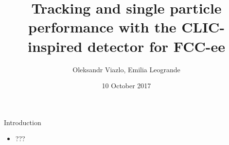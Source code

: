\documentclass[8pt]{beamer}
\newif\ifplacelogo %
\begin{document}
\newcommand{\myNode}{\tikz[baseline,inner sep=1pt] \node[anchor=base]}



\title[ CLIC-inspired detector for FCC-ee \hspace{13.5em}\insertframenumber/
\inserttotalframenumber]{ Tracking and single particle performance with the CLIC-inspired detector for FCC-ee }


	\author[Oleksandr Viazlo, Emilia Leogrande]{Oleksandr Viazlo, Emilia Leogrande \\ 
	}
	
       
	\date{10 October 2017}


	
   	\frame{\titlepage}

   	

\placelogofalse

\begin{frame}{\large \large Introduction}
 
 \begin{itemize}
  \item ???
 \end{itemize}

 
\end{frame}
\end{document}
